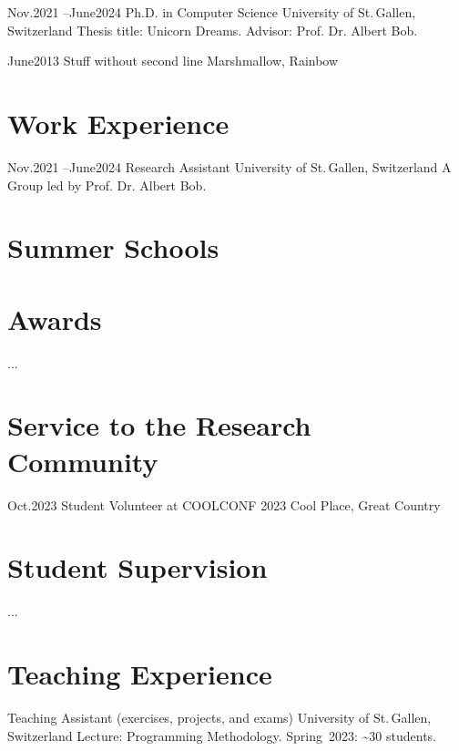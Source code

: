 \experience
	{Nov.}{2021 --}{June}{2024}
	{Ph.D. in Computer Science}
	{University of St.\,Gallen, Switzerland}
	{Thesis title: Unicorn Dreams.
    Advisor: Prof. Dr. Albert Bob.}

\experienceShort
	{June}{2013}
	{Stuff without second line}
	{Marshmallow, Rainbow}

\section*{Work Experience}

\experience
    {Nov.}{2021 --}{June}{2024}
    {Research Assistant}
    {University of St.\,Gallen, Switzerland}
    {A Group led by Prof. Dr. Albert Bob.}

\section*{Summer Schools}


\section*{Awards}

...

\section*{Service to the Research Community}

    
\experienceShort
    {Oct.}{2023}
    {Student Volunteer at COOLCONF 2023}
    {Cool Place, Great Country}

\section*{Student Supervision}

...

\section*{Teaching Experience}

\teaching
    {Teaching Assistant (exercises, projects, and exams)}
    {University of St.\,Gallen, Switzerland}
    {Lecture: Programming Methodology. \hfill Spring~2023: \textasciitilde30 students.}

